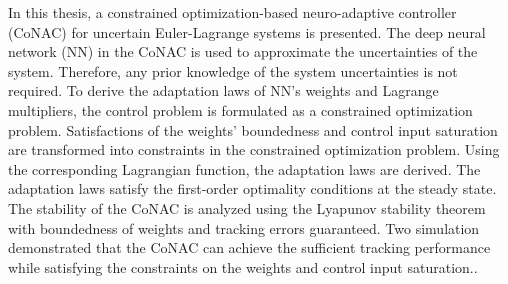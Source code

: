 
\summary

In this thesis, a constrained optimization-based neuro-adaptive controller \allowbreak (CoNAC) for uncertain Euler-Lagrange systems is presented. 
The deep neural network (NN) in the CoNAC is used to approximate the uncertainties of the system.
Therefore, any prior knowledge of the system uncertainties is not required.
To derive the adaptation laws of NN's weights and Lagrange multipliers, the control problem is formulated as a constrained optimization problem.
Satisfactions of the weights' boundedness and control input saturation are transformed into constraints in the constrained optimization problem.
Using the corresponding Lagrangian function, the adaptation laws are derived.
The adaptation laws satisfy the first-order optimality conditions at the steady state.
The stability of the CoNAC is analyzed using the Lyapunov stability theorem with boundedness of weights and tracking errors guaranteed.
Two simulation demonstrated that the CoNAC can achieve the sufficient tracking performance while satisfying the constraints on the weights and control input saturation..

